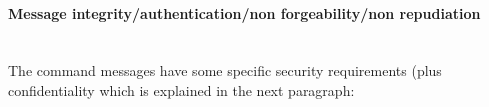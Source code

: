 \paragraph{Message integrity/authentication/non forgeability/non repudiation} \hspace{0pt} \\
\small{The command messages have some specific security requirements (plus confidentiality which is explained in the next paragraph:}